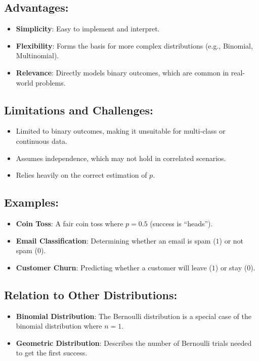 \subsection*{Advantages:}
\begin{itemize}
    \item \textbf{Simplicity}: Easy to implement and interpret.
    \item \textbf{Flexibility}: Forms the basis for more complex distributions (e.g., Binomial, Multinomial).
    \item \textbf{Relevance}: Directly models binary outcomes, which are common in real-world problems.
\end{itemize}

\subsection*{Limitations and Challenges:}
\begin{itemize}
    \item Limited to binary outcomes, making it unsuitable for multi-class or continuous data.
    \item Assumes independence, which may not hold in correlated scenarios.
    \item Relies heavily on the correct estimation of $p$.
\end{itemize}

\subsection*{Examples:}
\begin{itemize}
    \item \textbf{Coin Toss}: A fair coin toss where $p = 0.5$ (success is ``heads'').
    \item \textbf{Email Classification}: Determining whether an email is spam ($1$) or not spam ($0$).
    \item \textbf{Customer Churn}: Predicting whether a customer will leave ($1$) or stay ($0$).
\end{itemize}

\subsection*{Relation to Other Distributions:}
\begin{itemize}
    \item \textbf{Binomial Distribution}: The Bernoulli distribution is a special case of the binomial distribution where $n = 1$.
    \item \textbf{Geometric Distribution}: Describes the number of Bernoulli trials needed to get the first success.
\end{itemize}


